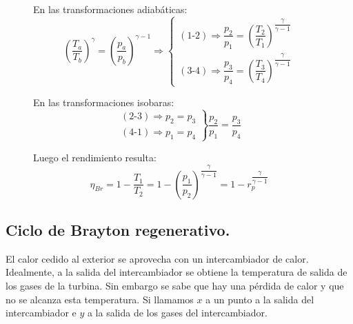 \begin{figure}[H]
\begin{minipage}{0.5\textwidth}
					En las transformaciones adiabáticas:
					\[\left(\dfrac{T_a}{T_b}\right)^\gamma = \left(\dfrac{p_a}{p_b}\right)^{\gamma-1} \Rightarrow \left\{
					\begin{matrix}
						(\text{1-2})\Rightarrow \dfrac{p_2}{p_1} = \left(\dfrac{T_2}{T_1}\right)^{\dfrac{\gamma}{\gamma-1}}\\
						(\text{3-4})\Rightarrow \dfrac{p_3}{p_4} = \left(\dfrac{T_3}{T_4}\right)^{\dfrac{\gamma}{\gamma-1}}
					\end{matrix}
					\right.
					\]
					
					En las transformaciones isobaras:
					\[\left.
					\begin{matrix}
						(\text{2-3})\Rightarrow p_2 = p_3\\
						(\text{4-1})\Rightarrow p_1 = p_4
					\end{matrix}
					\right\}
					\dfrac{p_2}{p_1} = \dfrac{p_3}{p_4}
					\]
					
					Luego el rendimiento resulta:
					\[\eta_{Br} = 1-\dfrac{T_1}{T_2} = 1-\left(\dfrac{p_1}{p_2}\right)^{\dfrac{\gamma}{\gamma-1}} = 1-r_p^{\dfrac{\gamma}{\gamma-1}}\]
				\end{minipage}
			\end{figure}
			
			
			
		\newpage
		\subsection{Ciclo de Brayton regenerativo.}
			El calor cedido al exterior se aprovecha con un intercambiador de calor. Idealmente, a la salida del intercambiador se obtiene la temperatura de salida de los gases de la turbina. Sin embargo se sabe que hay una pérdida de calor y que no se alcanza esta temperatura. Si llamamos $x$ a un punto a la salida del intercambiador e $y$ a la salida de los gases del intercambiador.
			
